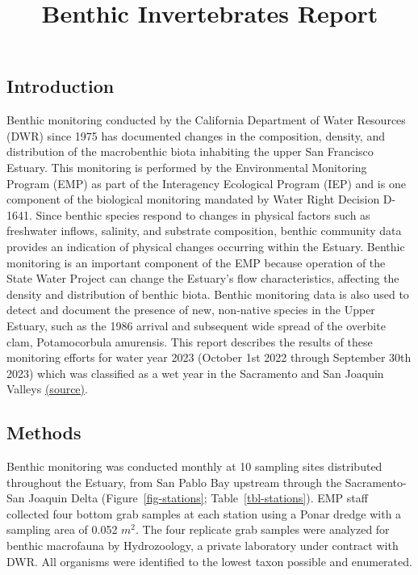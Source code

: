 \documentclass[
]{article}
\title{Benthic Invertebrates Report}
\author{}
\date{}
\renewcommand*\contentsname{Table of contents}
\newcommand\contentsname{Table of contents}
\begin{document}
\maketitle
\ifdefined\Shaded\renewenvironment{Shaded}{\begin{tcolorbox}[interior hidden, enhanced, sharp corners, frame hidden, breakable, boxrule=0pt, borderline west={3pt}{0pt}{shadecolor}]}{\end{tcolorbox}}\fi

\renewcommand*\contentsname{Contents}
{
\hypersetup{linkcolor=}
\setcounter{tocdepth}{3}
\tableofcontents
}
\hypertarget{introduction}{%
\subsection{Introduction}\label{introduction}}

Benthic monitoring conducted by the California Department of Water
Resources (DWR) since 1975 has documented changes in the composition,
density, and distribution of the macrobenthic biota inhabiting the upper
San Francisco Estuary. This monitoring is performed by the Environmental
Monitoring Program (EMP) as part of the Interagency Ecological Program
(IEP) and is one component of the biological monitoring mandated by
Water Right Decision D-1641. Since benthic species respond to changes in
physical factors such as freshwater inflows, salinity, and substrate
composition, benthic community data provides an indication of physical
changes occurring within the Estuary. Benthic monitoring is an important
component of the EMP because operation of the State Water Project can
change the Estuary's flow characteristics, affecting the density and
distribution of benthic biota. Benthic monitoring data is also used to
detect and document the presence of new, non-native species in the Upper
Estuary, such as the 1986 arrival and subsequent wide spread of the
overbite clam, Potamocorbula amurensis. This report describes the
results of these monitoring efforts for water year 2023 (October 1st
2022 through September 30th 2023) which was classified as a wet year in
the Sacramento and San Joaquin Valleys
\href{https://cdec.water.ca.gov/reportapp/javareports?name=WSIHIST}{(source)}.

\hypertarget{methods}{%
\subsection{Methods}\label{methods}}

Benthic monitoring was conducted monthly at 10 sampling sites
distributed throughout the Estuary, from San Pablo Bay upstream through
the Sacramento-San Joaquin Delta (Figure~\ref{fig-stations};
Table~\ref{tbl-stations}). EMP staff collected four bottom grab samples
at each station using a Ponar dredge with a sampling area of 0.052
\(m^2\). The four replicate grab samples were analyzed for benthic
macrofauna by Hydrozoology, a private laboratory under contract with
DWR. All organisms were identified to the lowest taxon possible and
enumerated.
\end{document}
